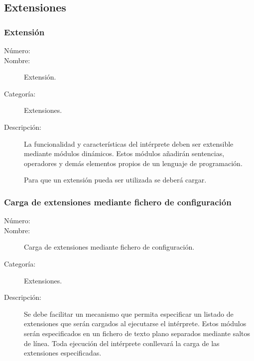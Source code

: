 \subsection{Extensiones}
\subsubsection{Extensión}
	\begin{description}
		\item [Número:] \cn
		\item [Nombre:] Extensión.
		\item [Categoría:] Extensiones.
		\item [Descripción:] La funcionalidad y características del intérprete deben ser extensible mediante módulos dinámicos. 
      Estos módulos añadirán sentencias, operadores y demás elementos propios de un lenguaje de programación. 
      
      Para que un extensión pueda ser utilizada se deberá cargar. 
	\end{description}

\subsubsection{Carga de extensiones mediante fichero de configuración}
	\begin{description}
		\item [Número:] \cn
		\item [Nombre:] Carga de extensiones mediante fichero de configuración.
		\item [Categoría:] Extensiones.
		\item [Descripción:] Se debe facilitar un mecanismo que permita especificar un listado de extensiones que serán cargados al ejecutarse
      el intérprete. Estos módulos serán especificados en un fichero de texto plano separados mediante saltos de línea. Toda ejecución del intérprete
      conllevará la carga de las extensiones especificadas.
	\end{description}

